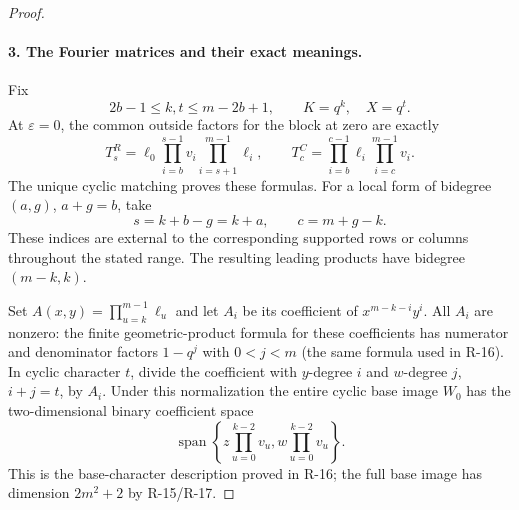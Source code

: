 \begin{proof}
\paragraph{3. The Fourier matrices and their exact meanings.}
Fix
\[
 2b-1\leq k,t\leq m-2b+1,\qquad K=q^k,\quad X=q^t.
\]
At $\varepsilon=0$, the common outside factors for the block at zero
are exactly
\begin{equation}\label{R22:outside}
 T_s^R=\ell_0\prod_{i=b}^{s-1}v_i\prod_{i=s+1}^{m-1}\ell_i,
 \qquad
 T_c^C=\prod_{i=b}^{c-1}\ell_i\prod_{i=c}^{m-1}v_i.
\end{equation}
The unique cyclic matching proves these formulas. For a local form
of bidegree $(a,g)$, $a+g=b$, take
\begin{equation}\label{R22:alignment}
 s=k+b-g=k+a,\qquad c=m+g-k.
\end{equation}
These indices are external to the corresponding supported rows or
columns throughout the stated range. The resulting leading products
have bidegree $(m-k,k)$.

Set $A(x,y)=\prod_{u=k}^{m-1}\ell_u$ and let $A_i$ be its coefficient
of $x^{m-k-i}y^i$. All $A_i$ are nonzero: the finite geometric-product
formula for these coefficients has numerator and denominator factors
$1-q^j$ with $0<j<m$ (the same formula used in R-16).
In cyclic character $t$, divide the coefficient with $y$-degree $i$
and $w$-degree $j$, $i+j=t$, by $A_i$.
Under this normalization the entire cyclic base image $W_0$ has the
two-dimensional binary coefficient space
\begin{equation}\label{R22:base}
 \operatorname{span}\left\{
 z\prod_{u=0}^{k-2}v_u,
 w\prod_{u=0}^{k-2}v_u\right\}.
\end{equation}
This is the base-character description proved in R-16; the full base
image has dimension $2m^2+2$ by R-15/R-17.


\end{proof}
